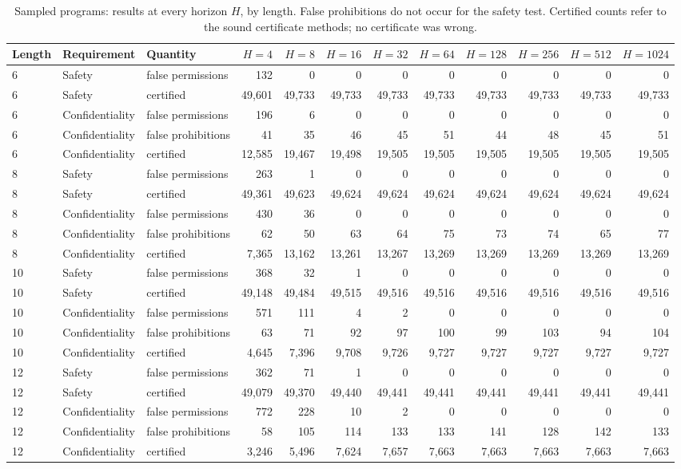 \begin{table}[tbp]\centering\scriptsize
\caption{Sampled programs: results at every horizon $H$, by length. False prohibitions do not occur for the safety test. Certified counts refer to the sound certificate methods; no certificate was wrong.}
\label{tab:S1sampled}
\setlength{\tabcolsep}{2.4pt}
\begin{tabular}{lllrrrrrrrrr}
\toprule
Length & Requirement & Quantity & $H{=}4$ & $H{=}8$ & $H{=}16$ & $H{=}32$ & $H{=}64$ & $H{=}128$ & $H{=}256$ & $H{=}512$ & $H{=}1024$\\
\midrule
6 & Safety & false permissions & 132 & 0 & 0 & 0 & 0 & 0 & 0 & 0 & 0\\
6 & Safety & certified & 49,601 & 49,733 & 49,733 & 49,733 & 49,733 & 49,733 & 49,733 & 49,733 & 49,733\\
6 & Confidentiality & false permissions & 196 & 6 & 0 & 0 & 0 & 0 & 0 & 0 & 0\\
6 & Confidentiality & false prohibitions & 41 & 35 & 46 & 45 & 51 & 44 & 48 & 45 & 51\\
6 & Confidentiality & certified & 12,585 & 19,467 & 19,498 & 19,505 & 19,505 & 19,505 & 19,505 & 19,505 & 19,505\\
8 & Safety & false permissions & 263 & 1 & 0 & 0 & 0 & 0 & 0 & 0 & 0\\
8 & Safety & certified & 49,361 & 49,623 & 49,624 & 49,624 & 49,624 & 49,624 & 49,624 & 49,624 & 49,624\\
8 & Confidentiality & false permissions & 430 & 36 & 0 & 0 & 0 & 0 & 0 & 0 & 0\\
8 & Confidentiality & false prohibitions & 62 & 50 & 63 & 64 & 75 & 73 & 74 & 65 & 77\\
8 & Confidentiality & certified & 7,365 & 13,162 & 13,261 & 13,267 & 13,269 & 13,269 & 13,269 & 13,269 & 13,269\\
10 & Safety & false permissions & 368 & 32 & 1 & 0 & 0 & 0 & 0 & 0 & 0\\
10 & Safety & certified & 49,148 & 49,484 & 49,515 & 49,516 & 49,516 & 49,516 & 49,516 & 49,516 & 49,516\\
10 & Confidentiality & false permissions & 571 & 111 & 4 & 2 & 0 & 0 & 0 & 0 & 0\\
10 & Confidentiality & false prohibitions & 63 & 71 & 92 & 97 & 100 & 99 & 103 & 94 & 104\\
10 & Confidentiality & certified & 4,645 & 7,396 & 9,708 & 9,726 & 9,727 & 9,727 & 9,727 & 9,727 & 9,727\\
12 & Safety & false permissions & 362 & 71 & 1 & 0 & 0 & 0 & 0 & 0 & 0\\
12 & Safety & certified & 49,079 & 49,370 & 49,440 & 49,441 & 49,441 & 49,441 & 49,441 & 49,441 & 49,441\\
12 & Confidentiality & false permissions & 772 & 228 & 10 & 2 & 0 & 0 & 0 & 0 & 0\\
12 & Confidentiality & false prohibitions & 58 & 105 & 114 & 133 & 133 & 141 & 128 & 142 & 133\\
12 & Confidentiality & certified & 3,246 & 5,496 & 7,624 & 7,657 & 7,663 & 7,663 & 7,663 & 7,663 & 7,663\\
\bottomrule
\end{tabular}
\end{table}
